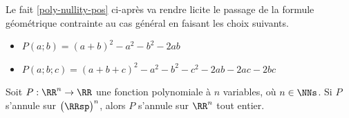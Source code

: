 Le fait \ref{poly-nullity-pos} ci-après va rendre licite le passage de la formule géométrique contrainte au cas général en faisant les choix suivants.
%
\begin{itemize}[label=\small\textbullet]
	\item $P(a ; b) = (a + b)^2 - a^2 - b^2 - 2 ab$

	\item $P(a ; b ; c) = (a + b + c)^2 - a^2 - b^2 - c^2 - 2 ab - 2 ac - 2 bc$
\end{itemize}




\begin{fact} \label{poly-nullity-pos}
	Soit $P: \RR^n \rightarrow \RR$ une fonction polynomiale à $n$ variables, où $n \in \NNs$.
	Si $P$ s'annule sur $\big( \RRsp \big)^n$, alors $P$ s'annule sur $\RR^n$ tout entier. 
\end{fact}


